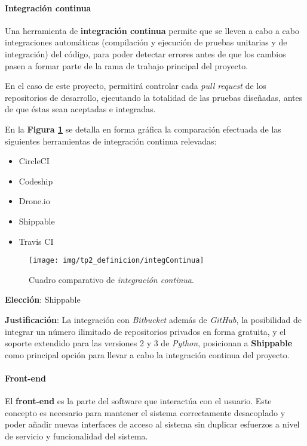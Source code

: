 \paragraph{Integración continua}

	Una herramienta de \textbf{integración continua} permite que se lleven a cabo a cabo integraciones automáticas (compilación y ejecución de pruebas unitarias y de integración) del código, para poder detectar errores antes de que los cambios pasen a formar parte de la rama de trabajo principal del proyecto.

En el caso de este proyecto, permitirá controlar cada \textit{pull request} de los repositorios de desarrollo, ejecutando la totalidad de las pruebas diseñadas, antes de que éstas sean aceptadas e integradas.

En la \textbf{Figura \ref{comparativaIC}} se detalla en forma gráfica la comparación efectuada de las siguientes herramientas de integración continua relevadas:
\begin{itemize}
    \item CircleCI
    \item Codeship
    \item Drone.io
    \item Shippable
    \item Travis CI
\end{itemize}


\begin{figure}
  \centering
\texttt{[image: img/tp2\_definicion/integContinua]}
  \caption{Cuadro comparativo de \textit{integración continua}.}
  \label{comparativaIC}
\end{figure}

\textbf{Elección}: Shippable

\textbf{Justificación}:
La integración con \textit{Bitbucket} además de \textit{GitHub}, la posibilidad de integrar un número ilimitado de repositorios privados en forma gratuita, y el soporte extendido para las versiones 2 y 3 de \textit{Python}, posicionan a \textbf{Shippable} como principal opción para llevar a cabo la integración continua del proyecto.


\paragraph{Front-end}

El \textbf{front-end} es la parte del software que interactúa con el usuario.
Este concepto es necesario para mantener el sistema correctamente desacoplado y poder añadir nuevas interfaces de acceso al sistema sin duplicar esfuerzos a nivel de servicio y funcionalidad del sistema.

